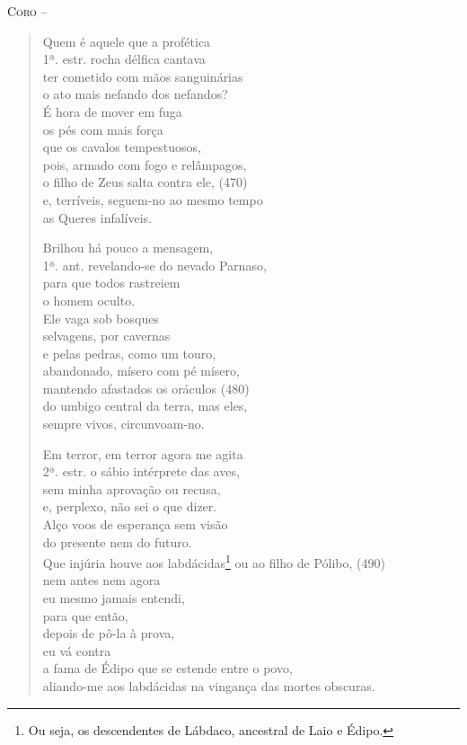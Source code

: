 \textsc{Coro} --  \begin{verse}Quem é aquele que a profética\\ 1ª. estr.
rocha délfica cantava\\
ter cometido com mãos sanguinárias\\
o ato mais nefando dos nefandos?\\
É hora de mover em fuga\\
os pés com mais força\\
que os cavalos tempestuosos,\\
pois, armado com fogo e relâmpagos,\\
o filho de Zeus salta contra ele, (470)\\
e, terríveis, seguem-no ao mesmo tempo\\
as Queres infalíveis.

Brilhou há pouco a mensagem,\\ 1ª. ant.
revelando-se do nevado Parnaso,\\
para que todos rastreiem\\
o homem oculto.\\
Ele vaga sob bosques\\
selvagens, por cavernas\\
e pelas pedras, como um touro,\\
abandonado, mísero com pé mísero,\\
mantendo afastados os oráculos (480)\\
do umbigo central da terra, mas eles,\\
sempre vivos, circunvoam-no.

Em terror, em terror agora me agita\\ 2ª. estr.
o sábio intérprete das aves,\\
sem minha aprovação ou recusa,\\
e, perplexo, não sei o que dizer.\\
Alço voos de esperança sem visão\\
do presente nem do futuro.\\
Que injúria houve aos labdácidas\footnote{Ou seja, os descendentes de Lábdaco, ancestral de Laio e Édipo.}
ou ao filho de Pólibo, (490)\\
nem antes nem agora\\
eu mesmo jamais entendi,\\
para que então,\\
depois de pô-la à prova,\\
eu vá contra\\
a fama de Édipo que se estende entre o povo,\\
aliando-me aos labdácidas na vingança das mortes obscuras.


\end{verse}
